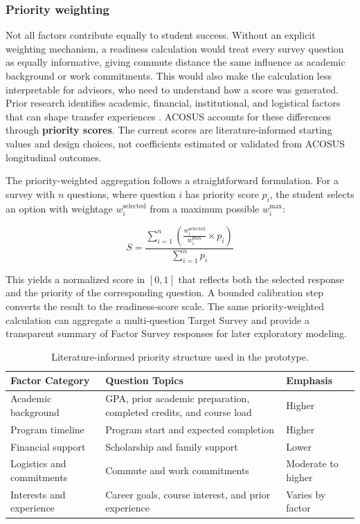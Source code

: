 \documentclass[letterpaper,11pt]{article}
\begin{document}
\subsubsection{Priority weighting}

Not all factors contribute equally to student success. Without an explicit weighting mechanism, a readiness calculation would treat every survey question as equally informative, giving commute distance the same influence as academic background or work commitments. This would also make the calculation less interpretable for advisors, who need to understand how a score was generated. Prior research identifies academic, financial, institutional, and logistical factors that can shape transfer experiences \parencite{factoranalysis2023,computingtransfer2024}. ACOSUS accounts for these differences through \textbf{priority scores}. The current scores are literature-informed starting values and design choices, not coefficients estimated or validated from ACOSUS longitudinal outcomes.

The priority-weighted aggregation follows a straightforward formulation. For a survey with $n$ questions, where question $i$ has priority score $p_i$, the student selects an option with weightage $w_i^{\text{selected}}$ from a maximum possible $w_i^{\text{max}}$:

\begin{equation}
S = \frac{\sum_{i=1}^{n} \left(\frac{w_i^{\text{selected}}}{w_i^{\text{max}}} \times p_i\right)}{\sum_{i=1}^{n} p_i}
\label{eq:priority}
\end{equation}

This yields a normalized score in $[0, 1]$ that reflects both the selected response and the priority of the corresponding question. A bounded calibration step converts the result to the readiness-score scale. The same priority-weighted calculation can aggregate a multi-question Target Survey and provide a transparent summary of Factor Survey responses for later exploratory modeling.

\begin{table}[htbp]
\caption{Literature-informed priority structure used in the prototype.}
\label{tab:priority}
\centering
\begin{tabular}{@{}p{3.4cm}p{8.0cm}p{2.4cm}@{}}
\toprule
\textbf{Factor Category} & \textbf{Question Topics} & \textbf{Emphasis} \\
\midrule
Academic background & GPA, prior academic preparation, completed credits, and course load & Higher \\
\addlinespace[2pt]
Program timeline & Program start and expected completion & Higher \\
\addlinespace[2pt]
Financial support & Scholarship and family support & Lower \\
\addlinespace[2pt]
Logistics and commitments & Commute and work commitments & Moderate to higher \\
\addlinespace[2pt]
Interests and experience & Career goals, course interest, and prior experience & Varies by factor \\
\bottomrule
\end{tabular}
\end{table}
\end{document}

